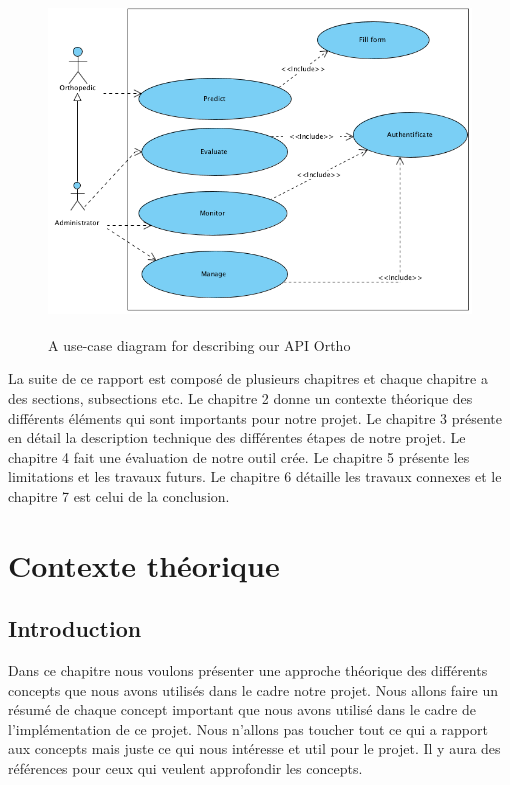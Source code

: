 \documentclass[12pt, french]{report}
\begin{document}
\begin{figure}[h]
	\includegraphics[width=17cm, height =9cm]{images/UseCaseDiag.png}
	\caption{A use-case diagram for describing our API Ortho}
	\label{usecase}
\end{figure} 

La suite de ce rapport est composé de plusieurs chapitres et chaque chapitre a des sections, subsections etc. Le chapitre 2 donne un contexte théorique des différents éléments qui sont importants pour notre projet. Le chapitre 3 présente en détail la description technique des différentes étapes de notre projet. Le chapitre 4 fait une évaluation de notre outil crée. Le chapitre 5 présente les limitations et les travaux futurs. Le chapitre 6 détaille les travaux connexes et le chapitre 7 est celui de la conclusion.


\newpage

\chapter{Contexte théorique}
\section{Introduction}

Dans ce chapitre nous voulons présenter une approche théorique des différents concepts que nous avons utilisés dans le cadre notre projet. Nous allons faire un résumé de chaque concept important que nous avons utilisé dans le cadre de l'implémentation de ce projet. Nous n'allons pas toucher tout ce qui a rapport aux concepts mais juste ce qui nous intéresse et util pour le projet. Il y aura des références pour ceux qui veulent approfondir les concepts. 
\end{document}
